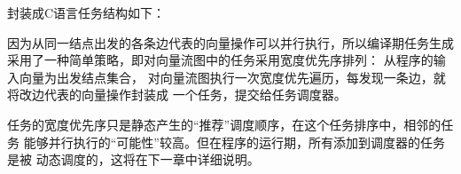 封装成C语言任务结构如下：


因为从同一结点出发的各条边代表的向量操作可以并行执行，所以编译期任务生成
采用了一种简单策略，即对向量流图中的任务采用宽度优先序排列：
从程序的输入向量为出发结点集合，
对向量流图执行一次宽度优先遍历，每发现一条边，就将改边代表的向量操作封装成
一个任务，提交给任务调度器。

任务的宽度优先序只是静态产生的“推荐”调度顺序，在这个任务排序中，相邻的任务
能够并行执行的“可能性”较高。但在程序的运行期，所有添加到调度器的任务是被
动态调度的，这将在下一章中详细说明。







